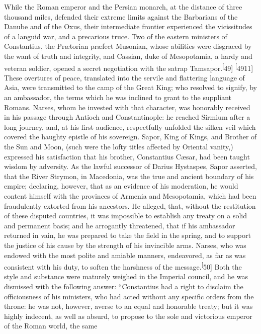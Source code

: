 While the Roman emperor and the Persian monarch, at the distance
of three thousand miles, defended their extreme limits against
the Barbarians of the Danube and of the Oxus, their intermediate
frontier experienced the vicissitudes of a languid war, and a
precarious truce. Two of the eastern ministers of Constantius,
the Prætorian præfect Musonian, whose abilities were disgraced by
the want of truth and integrity, and Cassian, duke of
Mesopotamia, a hardy and veteran soldier, opened a secret
negotiation with the satrap Tamsapor.\textsuperscript[49] \textsuperscript[4911] These overtures of
peace, translated into the servile and flattering language of
Asia, were transmitted to the camp of the Great King; who
resolved to signify, by an ambassador, the terms which he was
inclined to grant to the suppliant Romans. Narses, whom he
invested with that character, was honorably received in his
passage through Antioch and Constantinople: he reached Sirmium
after a long journey, and, at his first audience, respectfully
unfolded the silken veil which covered the haughty epistle of his
sovereign. Sapor, King of Kings, and Brother of the Sun and Moon,
(such were the lofty titles affected by Oriental vanity,)
expressed his satisfaction that his brother, Constantius Cæsar,
had been taught wisdom by adversity. As the lawful successor of
Darius Hystaspes, Sapor asserted, that the River Strymon, in
Macedonia, was the true and ancient boundary of his empire;
declaring, however, that as an evidence of his moderation, he
would content himself with the provinces of Armenia and
Mesopotamia, which had been fraudulently extorted from his
ancestors. He alleged, that, without the restitution of these
disputed countries, it was impossible to establish any treaty on
a solid and permanent basis; and he arrogantly threatened, that
if his ambassador returned in vain, he was prepared to take the
field in the spring, and to support the justice of his cause by
the strength of his invincible arms. Narses, who was endowed with
the most polite and amiable manners, endeavored, as far as was
consistent with his duty, to soften the harshness of the message.\textsuperscript[50]
Both the style and substance were maturely weighed in the
Imperial council, and he was dismissed with the following answer:
“Constantius had a right to disclaim the officiousness of his
ministers, who had acted without any specific orders from the
throne: he was not, however, averse to an equal and honorable
treaty; but it was highly indecent, as well as absurd, to propose
to the sole and victorious emperor of the Roman world, the same
